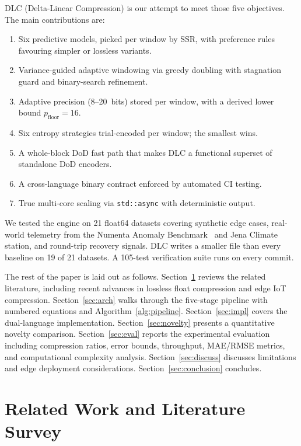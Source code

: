 \documentclass[runningheads]{llncs}
\begin{document}
DLC (Delta-Linear Compression) is our attempt to meet those five objectives. The main contributions are:

\begin{enumerate}
\item Six predictive models, picked per window by SSR, with preference rules favouring simpler or lossless variants.
\item Variance-guided adaptive windowing via greedy doubling with stagnation guard and binary-search refinement.
\item Adaptive precision (8--20~bits) stored per window, with a derived lower bound $p_{\text{floor}} = 16$.
\item Six entropy strategies trial-encoded per window; the smallest wins.
\item A whole-block DoD fast path that makes DLC a functional superset of standalone DoD encoders.
\item A cross-language binary contract enforced by automated CI testing.
\item True multi-core scaling via \texttt{std::async} with deterministic output.
\end{enumerate}

We tested the engine on 21 float64 datasets covering synthetic edge cases, real-world telemetry from the Numenta Anomaly Benchmark~\cite{numenta2017} and Jena Climate station, and round-trip recovery signals. DLC writes a smaller file than every baseline on 19 of 21 datasets. A 105-test verification suite runs on every commit.

The rest of the paper is laid out as follows. Section~\ref{sec:related} reviews the related literature, including recent advances in lossless float compression and edge IoT compression. Section~\ref{sec:arch} walks through the five-stage pipeline with numbered equations and Algorithm~\ref{alg:pipeline}. Section~\ref{sec:impl} covers the dual-language implementation. Section~\ref{sec:novelty} presents a quantitative novelty comparison. Section~\ref{sec:eval} reports the experimental evaluation including compression ratios, error bounds, throughput, MAE/RMSE metrics, and computational complexity analysis. Section~\ref{sec:discuss} discusses limitations and edge deployment considerations. Section~\ref{sec:conclusion} concludes.


\section{Related Work and Literature Survey}
\label{sec:related}
\end{document}
